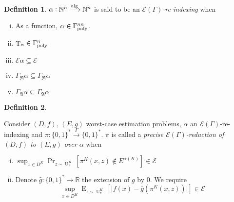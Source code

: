 \documentclass[a4paper]{article}
\numberwithin{equation}{section}
\theoremstyle{definition}
\newtheorem{definition}{Definition}[section]
\theoremstyle{plain}
\newcommand{\Bool}{\{0,1\}}
\newcommand{\Words}{{\Bool^*}}
\DeclareMathOperator{\Prb}{Pr}
\DeclareMathOperator{\E}{E}
\DeclareMathOperator{\T}{T}
\DeclareMathOperator{\Un}{U}
\newcommand{\Nats}{\mathbb{N}}
\newcommand{\Reals}{\mathbb{R}}
\newcommand{\Abs}[1]{\lvert #1 \rvert}
\newcommand{\GrowR}{\Gamma_{\mathfrak{R}}}
\newcommand{\GrowA}{\Gamma_{\mathfrak{A}}}
\newcommand{\Fall}{\mathcal{E}}
\newcommand{\EG}{\Fall(\Gamma)}
\newcommand{\Alg}{\xrightarrow{\textnormal{alg}}}
\newcommand{\Scheme}{\xrightarrow{\Gamma}}
\begin{document}
\begin{samepage}
\begin{definition}

${\alpha: \Nats^n \Alg \Nats^n}$ is said to be an \emph{${\EG}$-re-indexing} when

\begin{enumerate}[(i)]

\item\label{con:def__wc_reduce__pol_deg} As a function, ${\alpha \in \Gamma_{\textnormal{poly}}^{nn}}$.

\item\label{con:def__wc_reduce__eff_deg} ${\T_\alpha \in \Gamma_{\textnormal{poly}}^n}$

\item $\Fall \alpha \subseteq \Fall$

\item $\GrowR \alpha \subseteq \GrowR \alpha$

\item $\GrowA \alpha \subseteq \GrowA \alpha$

\end{enumerate}

\end{definition}
\end{samepage}

\begin{samepage}
\begin{definition}
\label{def:wc_reduce}

Consider $(D,f)$, $(E,g)$ worst-case estimation problems, ${\alpha}$ an ${\EG}$-re-indexing and ${\pi: \Words \Scheme \Words}$. $\pi$ is called a \emph{precise $\EG$-reduction of $(D,f)$ to $(E,g)$ over ${\alpha}$} when

\begin{enumerate}[(i)]

\item\label{con:def__wc_reduce__fam} $\sup_{x \in D^K} \Prb_{z \sim \Un_\pi^{K}}[\pi^K(x,z) \not\in E^{\alpha(K)}] \in \Fall$

\item\label{con:def__wc_reduce__fun} Denote ${\bar{g}: \Words \rightarrow \Reals}$ the extension of $g$ by 0. We require \[\sup_{x \in D^K} \E_{z \sim \Un_\pi^{K}}[\Abs{f(x)-\bar{g}(\pi^{K}(x,z))}] \in \Fall\]

\end{enumerate}

\end{definition}
\end{samepage}
\end{document}
